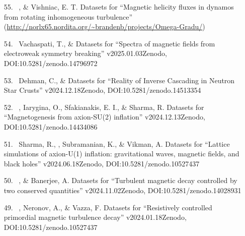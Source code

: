 \begin{itemize}

\item[{55.}~]
\Brandenburg, \& Vishniac, E. T.
{Datasets for ``Magnetic helicity fluxes in dynamos from rotating inhomogeneous turbulence''}
{(\url{http://norlx65.nordita.org/~brandenb/projects/Omega-Gradu/})}

\item[{54.}~]
Vachaspati, T., \& \Brandenburg{}
{Datasets for ``Spectra of magnetic fields from electroweak symmetry breaking'' v2025.01.03}{Zenodo, DOI:10.5281/zenodo.14796972}

\item[{53.}~]
Dehman, C., \& \Brandenburg{}
{Datasets for ``Reality of Inverse Cascading in Neutron Star Crusts'' v2024.12.18}{Zenodo, DOI:10.5281/zenodo.14513354}

\item[{52.}~]
\Brandenburg, Iarygina, O., Sfakianakis, E. I., \& Sharma, R.
{Datasets for ``Magnetogenesis from axion-SU(2) inflation'' v2024.12.13}{Zenodo, DOI:10.5281/zenodo.14434086}

\item[{51.}~]
Sharma, R., \Brandenburg, Subramanian, K., \& Vikman, A.
{Datasets for ``Lattice simulations of axion-U(1) inflation: gravitational waves, magnetic fields, and black holes'' v2024.06.18}{Zenodo, DOI:10.5281/zenodo.10527437}

\item[{50.}~]
\Brandenburg, \& Banerjee, A.
{Datasets for ``Turbulent magnetic decay controlled by two conserved quantities'' v2024.11.02}{Zenodo, DOI:10.5281/zenodo.14028931}

\item[{49.}~]
\Brandenburg, Neronov, A., \& Vazza, F.
{Datasets for ``Resistively controlled primordial magnetic turbulence decay'' v2024.01.18}{Zenodo, DOI:10.5281/zenodo.10527437}


\end{itemize}
